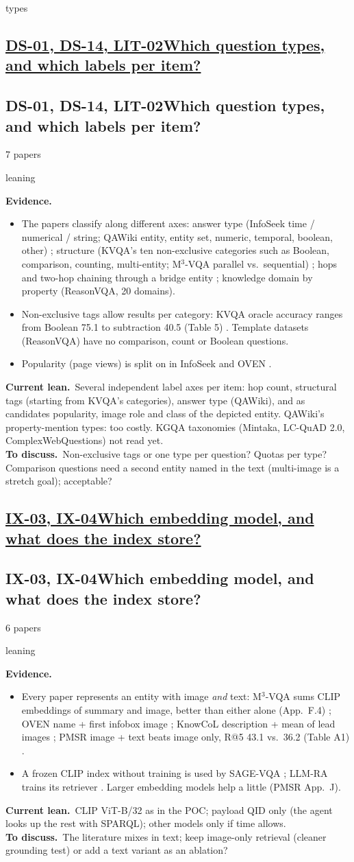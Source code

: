 \documentclass[10pt,a4paper]{article}
\newcommand{\st}[2]{\colorbox{#1}{\footnotesize\strut #2}}
\newcommand{\leaning}{\st{yellow!35}{leaning}}
\newcommand{\qblock}[1][]{\def\qkey{#1}\qblockx}
\newcommand{\qblockx}[4]{%
  \ifx\qkey\empty
  \subsection*{\underline{#1\quad #2}}%
  \else\hypertarget{\qkey}{}
  \subsection*{#1\quad #2}\fi%
{\footnotesize #3 papers\quad}#4\par}
\newcommand{\ev}{\textbf{Evidence.}}
\newcommand{\lean}{\textbf{Current lean.}}
\newcommand{\ask}{\textbf{To discuss.}}
\begin{document}
\qblock[types]{DS-01, DS-14, LIT-02}{Which question types, and which labels
per item?}{7}{\leaning}
\ev
\begin{itemize}
  \item The papers classify along different axes: answer type (InfoSeek
      time / numerical / string; QAWiki entity, entity set, numeric, temporal,
    boolean, other) \cite{chen2023can,loustaunau2025qawiki}; structure (KVQA's
      ten non-exclusive categories such as Boolean, comparison, counting,
    multi-entity; M$^3$-VQA parallel vs.\ sequential)
    \cite{shah2019kvqa,ma2026m3}; hops and two-hop chaining through a bridge
    entity \cite{tran2025reasonvqa,mensink2023encyclopedic}; knowledge domain
    by property (ReasonVQA, 20 domains).
  \item Non-exclusive tags allow results per category: KVQA oracle accuracy
    ranges from Boolean 75.1 to subtraction 40.5 (Table 5) \cite{shah2019kvqa}.
    Template datasets (ReasonVQA) have no comparison, count or Boolean
    questions.
  \item Popularity (page views) is split on in InfoSeek and OVEN
    \cite{chen2023can,hu2023open}.
\end{itemize}
\lean\ Several independent label axes per item: hop count, structural
tags (starting from KVQA's categories), answer type (QAWiki), and as
candidates popularity, image role and class of the depicted entity.
QAWiki's property-mention types: too costly. KGQA taxonomies (Mintaka,
LC-QuAD 2.0, ComplexWebQuestions) not read yet.\\
\ask\ Non-exclusive tags or one type per question? Quotas per type? Comparison
questions need a second entity named in the text (multi-image is a stretch
goal); acceptable?

\qblock{IX-03, IX-04}{Which embedding model, and what does the index
store?}{6}{\leaning}
\ev
\begin{itemize}
  \item Every paper represents an entity with image \emph{and} text:
    M$^3$-VQA sums CLIP embeddings of summary and image, better than either
    alone (App.~F.4) \cite{ma2026m3}; OVEN name + first infobox image
    \cite{hu2023open}; KnowCoL description + mean of lead images
    \cite{zhou2025seeing}; PMSR image + text beats image only, R@5 43.1 vs.\
    36.2 (Table A1) \cite{choi2025progressive}.
  \item A frozen CLIP index without training is used by SAGE-VQA
    \cite[App.~A.7]{shen2026sage}; LLM-RA trains its retriever
    \cite{jian2024large}. Larger embedding models help a little (PMSR App.~J).
\end{itemize}
\lean\ CLIP ViT-B/32 as in the POC; payload QID only (the agent looks up
the rest with SPARQL); other models only if time allows.\\
\ask\ The literature mixes in text; keep image-only retrieval (cleaner
grounding test) or add a text variant as an ablation?
\end{document}
